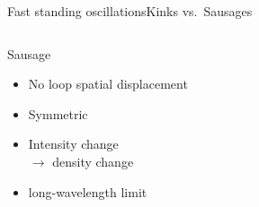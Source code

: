 \documentclass[11pt,table]{beamer}
\begin{document}
\begin{frame}{Fast standing oscillations}{Kinks vs.\ Sausages}
\begin{columns}
        \begin{block}{Sausage}
            \begin{itemize}
                \item No loop spatial displacement
                \item Symmetric
                \item Intensity change\\ $\rightarrow$ density change
                \item long-wavelength limit
            \end{itemize}
        \end{block}
\end{columns}
\end{frame}%
\end{document}
